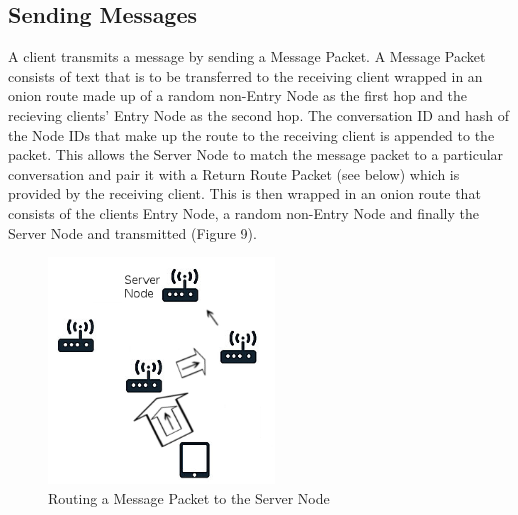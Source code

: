 \documentclass{article}
\begin{document}
\newpage

\subsection{Sending Messages}
A client transmits a message by sending a Message Packet. A Message Packet consists of text that is to be transferred to the receiving client wrapped 
in an onion route made up of a random non-Entry Node as the first hop and the recieving clients' Entry Node as the second hop. The conversation ID and 
hash of the Node IDs that make up the route to the receiving client is appended to the packet. This allows the Server Node to match the message packet 
to a particular conversation and pair it with a Return Route Packet (see below) which is provided by the receiving client. This is then wrapped in an onion 
route that consists of the clients Entry Node, a random non-Entry Node and finally the Server Node and transmitted (Figure 9).
\begin{figure}[h]
	\centering
  	\includegraphics[width=6cm,height=6cm,keepaspectratio]{img/MessagePacket.png}
	\caption{Routing a Message Packet to the Server Node}
\end{figure}
\end{document}
